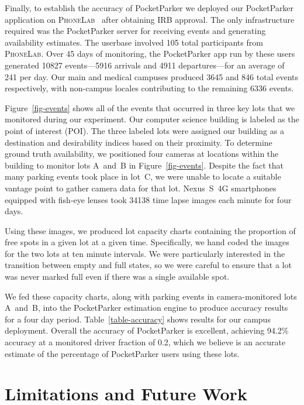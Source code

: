 \documentclass{sigchi}
\newcommand{\PhoneLab}{\textsc{PhoneLab}}
\begin{document}
Finally, to establish the accuracy of PocketParker we deployed our PocketParker
application on \PhoneLab{}~\cite{phonelab-testbed} after obtaining IRB approval. The only
infrastructure required was the PocketParker server for receiving events and
generating availability estimates. The userbase involved 105 total participants
from \PhoneLab{}.  Over 45 days of monitoring, the PocketParker app  run by
these users
generated \num{10827} events---5916 arrivals and 4911 departures---for an
average of 241 per day. Our main and medical campuses produced 3645 and 846
total events respectively, with non-campus locales contributing to the
remaining 6336 events.

Figure~\ref{fig-events} shows all of the events that occurred in three key
lots that we monitored during our experiment. Our computer science building
is labeled as the point of interest (POI). The three labeled lots were
assigned our building as a destination and desirability indices based on
their proximity. To determine ground truth availability, we positioned four
cameras at locations within the building to monitor lots A~and~B in
Figure~\ref{fig-events}. Despite the fact that many parking events took place
in lot~C, we were unable to locate a suitable vantage point to gather camera
data for that lot. Nexus~S~4G smartphones equipped with fish-eye lenses took
\num{34138} time lapse images each minute for four days. 

Using these images, we produced lot capacity charts containing the proportion
of free spots in a given lot at a given time. Specifically, we
hand coded the images for the two lots at ten minute intervals. We were
particularly interested in the transition between empty and full states, so we
were careful to ensure that a lot was never marked full even if
there was a single available spot.

We fed these capacity charts, along with parking events in camera-monitored
lots A~and~B, into the PocketParker estimation engine to produce accuracy
results for a four day period.  Table~\ref{table-accuracy} shows results for
our campus deployment. Overall the accuracy of PocketParker is excellent,
achieving 94.2\% accuracy at a monitored driver fraction of 0.2, which we
believe is an accurate estimate of the percentage of PocketParker users using
these lots.


\section{Limitations and Future Work}
\end{document}
